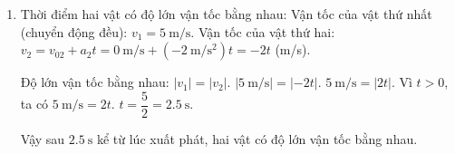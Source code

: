 \begin{ex}
{\begin{enumerate}[label=\alph*)]
			Vậy hai vật gặp nhau sau $\SI{5}{\second}$ kể từ lúc xuất phát.
			
			Vị trí gặp nhau: Thay $t=\SI{5}{\second}$ vào phương trình $x_1$ (hoặc $x_2$).
			$x_1(\SI{5}{\second}) = 5 \cdot \SI{5}{\second} = \SI{25}{\meter}$.
			(Kiểm tra lại $x_2(\SI{5}{\second}) = 50 - (\SI{5}{\second})^2 = 50 - 25 = \SI{25}{\meter}$.)
			Vậy hai vật gặp nhau tại vị trí cách A $\SI{25}{\meter}$.
			
			\item 
			Thời điểm hai vật có độ lớn vận tốc bằng nhau:
			Vận tốc của vật thứ nhất (chuyển động đều): $v_1 = \SI{5}{\meter/\second}$.
			Vận tốc của vật thứ hai: $v_2 = v_{02} + a_2 t = \SI{0}{\meter/\second} + (\SI{-2}{\meter/\second^2})t = -2t$ (m/s).
			
			Độ lớn vận tốc bằng nhau: $|v_1| = |v_2|$.
			$|\SI{5}{\meter/\second}| = |-2t|$.
			$\SI{5}{\meter/\second} = |2t|$.
			Vì $t > 0$, ta có $\SI{5}{\meter/\second} = 2t$.
			$t = \dfrac{5}{2} = \SI{2.5}{\second}$.
			
			Vậy sau $\SI{2.5}{\second}$ kể từ lúc xuất phát, hai vật có độ lớn vận tốc bằng nhau.
		\end{enumerate}
	}
\end{ex}

